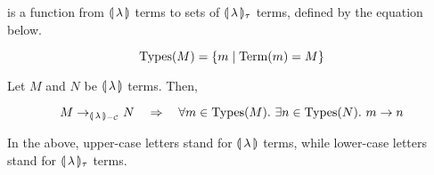 \begin{definition}
   is a function from $\llparenthesis \, \lambda \, \rrparenthesis$ terms to sets of
  $\llparenthesis \, \lambda \, \rrparenthesis_\tau$ terms, defined by the equation below.
  
  $$
  \operatorname{Types}(M) = \{ m \mid \operatorname{Term}(m) = M \}
  $$
\end{definition}

\begin{lemma}
  \label{lem:infinite-chains}
  Let $M$ and $N$ be $\llparenthesis \, \lambda \, \rrparenthesis$ terms. Then,

  $$
  M \to_{{\llparenthesis \, \lambda \, \rrparenthesis_{-\mathcal{C}}}} N \quad \Rightarrow \quad
  \forall m \in \operatorname{Types}(M).\ \exists n \in \operatorname{Types}(N).\ m \to n
  $$
  
  In the above, upper-case letters stand for $\llparenthesis \, \lambda \, \rrparenthesis$ terms,
  while lower-case letters stand for $\llparenthesis \, \lambda \, \rrparenthesis_\tau$ terms.
\end{lemma}

